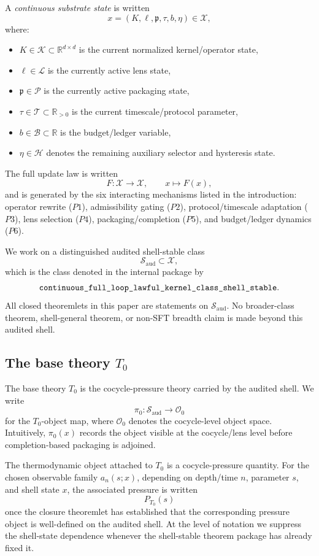 \documentclass[11pt]{article}
\theoremstyle{definition}
\newcommand{\R}{\mathbb{R}}
\newcommand{\Tzero}{T_0}
\begin{document}
A \emph{continuous substrate state} is written
\[
x=(K,\ell,\mathfrak{p},\tau,b,\eta)\in \mathcal{X},
\]
where:
\begin{itemize}
    \item \(K\in\mathcal{K}\subset \R^{d\times d}\) is the current normalized kernel/operator state,
    \item \(\ell\in\mathcal{L}\) is the currently active lens state,
    \item \(\mathfrak{p}\in\mathcal{P}\) is the currently active packaging state,
    \item \(\tau\in\mathcal{T}\subset \R_{>0}\) is the current timescale/protocol parameter,
    \item \(b\in\mathcal{B}\subset \R\) is the budget/ledger variable,
    \item \(\eta\in\mathcal{H}\) denotes the remaining auxiliary selector and hysteresis state.
\end{itemize}
The full update law is written
\[
F:\mathcal{X}\to\mathcal{X},\qquad x\mapsto F(x),
\]
and is generated by the six interacting mechanisms listed in the introduction:
operator rewrite (\(P1\)), admissibility gating (\(P2\)), protocol/timescale adaptation (\(P3\)), lens selection (\(P4\)), packaging/completion (\(P5\)), and budget/ledger dynamics (\(P6\)).

We work on a distinguished audited shell-stable class
\[
\mathcal{S}_{\mathrm{aud}}\subset \mathcal{X},
\]
which is the class denoted in the internal package by
\[
\texttt{continuous\_full\_loop\_lawful\_kernel\_class\_shell\allowbreak\_stable}.
\]
All closed theoremlets in this paper are statements on \(\mathcal{S}_{\mathrm{aud}}\). No broader-class theorem, shell-general theorem, or non-SFT breadth claim is made beyond this audited shell.

\subsection{The base theory \texorpdfstring{$\Tzero$}{T0}}

The base theory \(\Tzero\) is the cocycle-pressure theory carried by the audited shell. We write
\[
\pi_0:\mathcal{S}_{\mathrm{aud}}\to \mathcal{O}_0
\]
for the \(\Tzero\)-object map, where \(\mathcal{O}_0\) denotes the cocycle-level object space. Intuitively, \(\pi_0(x)\) records the object visible at the cocycle/lens level before completion-based packaging is adjoined.

The thermodynamic object attached to \(\Tzero\) is a cocycle-pressure quantity. For the chosen observable family \(a_n(s;x)\), depending on depth/time \(n\), parameter \(s\), and shell state \(x\), the associated pressure is written
\[
P_{\Tzero}(s)
\]
once the closure theoremlet has established that the corresponding pressure object is well-defined on the audited shell. At the level of notation we suppress the shell-state dependence whenever the shell-stable theorem package has already fixed it.
\end{document}
